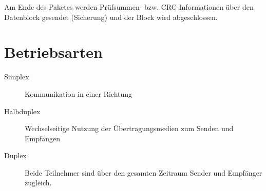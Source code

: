 Am Ende des Paketes werden Prüfsummen- bzw. CRC-Informationen über den Datenblock gesendet (Sicherung) und der Block wird abgeschlossen. 

\section{Betriebsarten}
\begin{description}
\item[Simplex] Kommunikation in einer Richtung
\item[Halbduplex] Wechselseitige Nutzung der Übertragungsmedien zum Senden und Empfangen
\item[Duplex] Beide Teilnehmer sind über den gesamten Zeitraum Sender und Empfänger zugleich.
\end{description}


